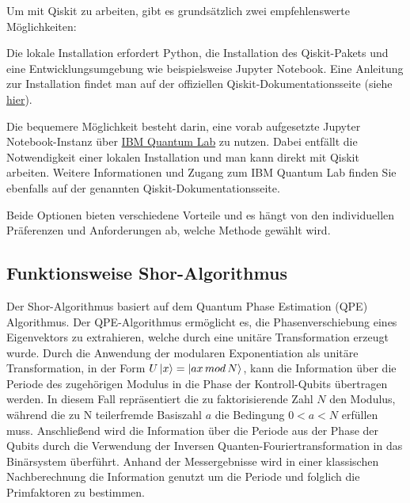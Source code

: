 \documentclass[
  a4paper, %
  10pt, %
  unnumberedsections, %
  twoside, %
]{LTJournalArticle}
\begin{document}
Um mit Qiskit zu arbeiten, gibt es grundsätzlich zwei empfehlenswerte Möglichkeiten:
\begin{description}[style=nextline]
\item[Lokale Installation]
Die lokale Installation erfordert Python,
die Installation des Qiskit-Pakets und eine Entwicklungsumgebung wie beispielsweise Jupyter Notebook.
Eine Anleitung zur Installation findet man auf der offiziellen Qiskit-Dokumentationsseite
(siehe \href{https://qiskit.org/documentation/stable/0.24/install.html}{hier}).
\item[IBM Quantum Lab]
Die bequemere Möglichkeit besteht darin,
eine vorab aufgesetzte Jupyter Notebook-Instanz über
\href{https://qiskit.org/documentation/stable/0.24/install.html}{IBM Quantum Lab}
zu nutzen.
Dabei entfällt die Notwendigkeit einer lokalen Installation und man kann direkt mit Qiskit arbeiten.
Weitere Informationen und Zugang zum IBM Quantum Lab finden Sie ebenfalls auf der genannten Qiskit-Dokumentationsseite.
\end{description}
Beide Optionen bieten verschiedene Vorteile und es hängt von den individuellen Präferenzen und Anforderungen ab,
welche Methode gewählt wird.

\subsection{\Large Funktionsweise Shor-Algorithmus}

Der Shor-Algorithmus basiert auf dem Quantum Phase Estimation (QPE) Algorithmus.
Der QPE-Algorithmus ermöglicht es, die Phasenverschiebung eines Eigenvektors zu extrahieren,
welche durch eine unitäre Transformation erzeugt wurde.
Durch die Anwendung der modularen Exponentiation als unitäre Transformation,
in der Form $U\ket{x} = \ket{ax\,mod\,N}$\autocite{IBM:Shor},
kann die Information über die Periode des zugehörigen Modulus in die Phase der Kontroll-Qubits übertragen werden.
In diesem Fall repräsentiert die zu faktorisierende Zahl $N$ den Modulus,
während die zu N teilerfremde Basiszahl $a$ die Bedingung $0 < a < N$ erfüllen muss.
Anschließend wird die Information über die Periode aus der Phase der Qubits
durch die Verwendung der Inversen Quanten-Fouriertransformation in das Binärsystem überführt.
Anhand der Messergebnisse wird in einer klassischen Nachberechnung die Information genutzt
um die Periode und folglich die Primfaktoren zu bestimmen.
\end{document}
